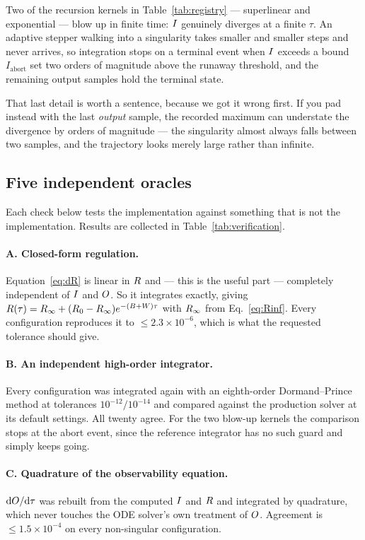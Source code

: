 Two of the recursion kernels in Table~\ref{tab:registry} --- superlinear and
exponential --- blow up in finite time: $I$ genuinely diverges at a finite
$\tau$. An adaptive stepper walking into a singularity takes smaller and smaller
steps and never arrives, so integration stops on a terminal event when $I$
exceeds a bound $I_{\mathrm{abort}}$ set two orders of magnitude above the
runaway threshold, and the remaining output samples hold the terminal state.

That last detail is worth a sentence, because we got it wrong first. If you pad
instead with the last \emph{output} sample, the recorded maximum can understate
the divergence by orders of magnitude --- the singularity almost always falls
between two samples, and the trajectory looks merely large rather than infinite.

\subsection{Five independent oracles}

Each check below tests the implementation against something that is not the
implementation. Results are collected in Table~\ref{tab:verification}.

\paragraph{A. Closed-form regulation.}
Equation~\eqref{eq:dR} is linear in $R$ and --- this is the useful part ---
completely independent of $I$ and $O$. So it integrates exactly, giving
$R(\tau)=R_\infty+(R_0-R_\infty)e^{-(B+W)\tau}$ with $R_\infty$
from Eq.~\eqref{eq:Rinf}. Every configuration reproduces it to
$\leq 2.3\times10^{-6}$, which is what the requested tolerance should give.

\paragraph{B. An independent high-order integrator.}
Every configuration was integrated again with an eighth-order Dormand--Prince
method at tolerances $10^{-12}/10^{-14}$ and compared against the production
solver at its default settings. All twenty agree. For the two blow-up kernels
the comparison stops at the abort event, since the reference integrator has no
such guard and simply keeps going.

\paragraph{C. Quadrature of the observability equation.}
$\mathrm{d}O/\mathrm{d}\tau$ was rebuilt from the computed $I$ and $R$
and integrated by quadrature, which never touches the ODE solver's own treatment
of $O$. Agreement is $\leq 1.5\times10^{-4}$ on every non-singular
configuration.

